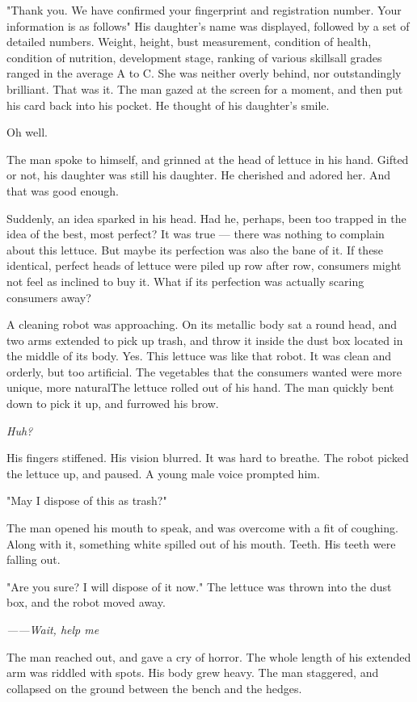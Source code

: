 "Thank you. We have confirmed your fingerprint and registration number.
Your information is as follows\el " His daughter's name was displayed,
followed by a set of detailed numbers. Weight, height, bust measurement,
condition of health, condition of nutrition, development stage, ranking
of various skills\el all grades ranged in the average A to C. She was
neither overly behind, nor outstandingly brilliant. That was it. The man
gazed at the screen for a moment, and then put his card back into his
pocket. He thought of his daughter's smile.

Oh well.

The man spoke to himself, and grinned at the head of lettuce in his
hand. Gifted or not, his daughter was still his daughter. He cherished
and adored her. And that was good enough.

Suddenly, an idea sparked in his head. Had he, perhaps, been too trapped
in the idea of the best, most perfect? It was true --- there was nothing
to complain about this lettuce. But maybe its perfection was also the
bane of it. If these identical, perfect heads of lettuce were piled up
row after row, consumers might not feel as inclined to buy it. What if
its perfection was actually scaring consumers away?

A cleaning robot was approaching. On its metallic body sat a round head,
and two arms extended to pick up trash, and throw it inside the dust box
located in the middle of its body. Yes. This lettuce was like that
robot. It was clean and orderly, but too artificial. The vegetables that
the consumers wanted were more unique, more natural\el The lettuce
rolled out of his hand. The man quickly bent down to pick it up, and
furrowed his brow.

\emph{Huh?}

His fingers stiffened. His vision blurred. It was hard to breathe. The
robot picked the lettuce up, and paused. A young male voice prompted
him.

"May I dispose of this as trash?"

The man opened his mouth to speak, and was overcome with a fit of
coughing. Along with it, something white spilled out of his mouth.
Teeth. His teeth were falling out.

"Are you sure? I will dispose of it now." The lettuce was thrown into
the dust box, and the robot moved away.

\emph{------Wait, help me\el }

The man reached out, and gave a cry of horror. The whole length of his
extended arm was riddled with spots. His body grew heavy. The man
staggered, and collapsed on the ground between the bench and the hedges.

